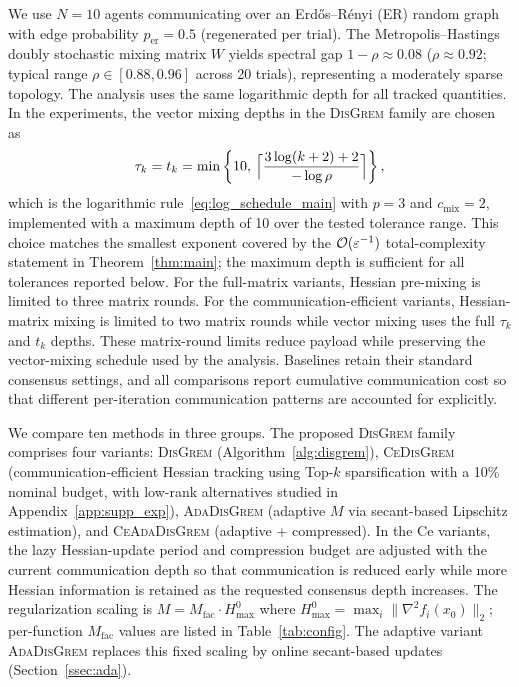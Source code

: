 \documentclass[review,onefignum,onetabnum]{siamart171218}
\begin{document}
	We use $N{=}10$ agents communicating over an Erd\H{o}s--R\'{e}nyi (ER) random graph
	with edge probability $p_{\mathrm{er}}{=}0.5$ (regenerated per trial).
	The Metropolis--Hastings doubly stochastic mixing matrix $W$ yields
	spectral gap $1{-}\rho\approx 0.08$
	($\rho\approx 0.92$; typical range $\rho\in[0.88,0.96]$ across 20 trials),
	representing a moderately sparse topology.
	The analysis uses the same logarithmic depth for all tracked quantities.
	In the experiments, the vector mixing depths in
	the \textsc{DisGrem} family are chosen as
	\[
	\tau_k=t_k=
	\min\left\{10,\,
	\Bigl\lceil \frac{3\log(k+2)+2}{-\log\rho}\Bigr\rceil
	\right\},
	\]
	which is the logarithmic rule~\eqref{eq:log_schedule_main} with
	$p=3$ and $c_{\mathrm{mix}}=2$, implemented with a maximum depth of
	10 over the tested tolerance range.
	This choice matches the smallest exponent covered by the
	$\mathcal{O}(\varepsilon^{-1})$ total-complexity statement in
	Theorem~\ref{thm:main}; the maximum depth is sufficient for all
	tolerances reported below.
	For the full-matrix variants, Hessian pre-mixing is limited to three
	matrix rounds. For the communication-efficient variants, Hessian-matrix
	mixing is limited to two matrix rounds while vector mixing uses the
	full $\tau_k$ and $t_k$ depths. These matrix-round limits reduce
	payload while preserving the vector-mixing schedule used by the
	analysis.
	Baselines retain their standard consensus settings, and all comparisons
	report cumulative communication cost so that different per-iteration
	communication patterns are accounted for explicitly.
	
	We compare ten methods in three groups.
	The proposed \textsc{DisGrem} family comprises four variants:
	\textsc{DisGrem} (Algorithm~\ref{alg:disgrem}),
	\textsc{CeDisGrem} (communication-efficient Hessian tracking using
	Top-$k$ sparsification with a 10\% nominal budget, with low-rank
	alternatives studied in Appendix~\ref{app:supp_exp}),
	\textsc{AdaDisGrem} (adaptive $M$ via secant-based Lipschitz estimation),
	and \textsc{CeAdaDisGrem} (adaptive + compressed).
	In the Ce variants, the lazy Hessian-update period and compression
	budget are adjusted with the current communication depth so that
	communication is reduced early while more Hessian information is
	retained as the requested consensus depth increases.
	The regularization scaling is $M = M_{\mathrm{fac}}\cdot H_{\max}^{0}$ where
	$H_{\max}^{0} = \max_i \|\nabla^2 f_i(x_0)\|_2$;
	per-function $M_{\mathrm{fac}}$ values are listed in Table~\ref{tab:config}.
	The adaptive variant \textsc{AdaDisGrem} replaces this fixed scaling
	by online secant-based updates (Section~\ref{ssec:ada}).
	
\end{document}
